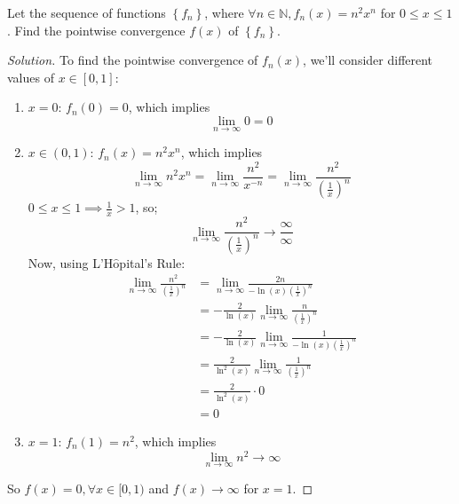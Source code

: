 \documentclass{article}
\newcommand{\be}{\begin{enumerate}}
\newcommand{\ee}{\end{enumerate}}
\begin{document}
	\item Let the sequence of functions $\left\{f_n\right\}$, where $\forall n \in \mathbb{N}, f_n(x) = n^2x^n$ for $0 \leq x \leq 1$. Find the pointwise convergence $f(x)$ of $\left\{f_n\right\}$.
	\begin{proof}[Solution]
	To find the pointwise convergence of $f_n(x)$, we'll consider different values of $x \in [0,1]$:
	\be 
		\item[$x = 0$:]
			$f_n(0) = 0$, which implies
			$$\lim_{n\to\infty}0 = 0$$
		
		\item[$x \in (0,1)$:]
			$f_n(x) = n^2x^n$, which implies
			$$\lim_{n\to\infty}n^2x^n = \lim_{n\to\infty}\frac{n^2}{x^{-n}} = \lim_{n\to\infty} \frac{n^2}{\left(\frac{1}{x}\right)^n}$$
			$0\leq x \leq 1 \implies \frac{1}{x} > 1$, so;
			$$\lim_{n\to\infty} \frac{n^2}{\left(\frac{1}{x}\right)^n} \to \frac{\infty}{\infty}$$
			Now, using L'H$\hat{\text{o}}$pital's Rule:
			\begin{align*}
			\lim_{n\to\infty} \frac{n^2}{\left(\frac{1}{x}\right)^n} &= \lim_{n\to\infty} \frac{2n}{-\ln(x)\left(\frac{1}{x}\right)^n}\\
			&= -\frac{2}{\ln(x)}\lim_{n\to\infty} \frac{n}{\left(\frac{1}{x}\right)^n}\\
			&= -\frac{2}{\ln(x)}\lim_{n\to\infty} \frac{1}{-\ln(x)\left(\frac{1}{x}\right)^n}\\
			&= \frac{2}{\ln^2(x)}\lim_{n\to\infty} \frac{1}{\left(\frac{1}{x}\right)^n}\\
			&= \frac{2}{\ln^2(x)}\cdot 0\\
			&= 0
			\end{align*}
		
		\item[$x=1$:]
		$f_n(1) = n^2$, which implies
		$$\lim_{n\to\infty}n^2 \to \infty$$
	\ee
	So $f(x) = 0, \forall x \in [0,1)$ and $f(x) \to\infty$ for $x=1$.
	\end{proof}
	
\end{document}
